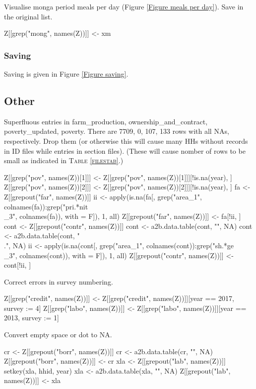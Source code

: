 Visualise monga period meals per day (\textsf{\small Figure \ref{Figure meals per day}}).
Save in the original list.
\begin{Schunk}
\begin{Sinput}
Z[[grep("mong", names(Z))]] <- xm
\end{Sinput}
\end{Schunk}


\subsubsection{Saving}


Saving is given in \textsf{\small Figure \ref{Figure saving}}.


\subsection{Other}


Superfluous entries in \textsf{farm\_production, ownership\_and\_contract, poverty\_updated, poverty}. There are 7709, 0, 107, 133 rows with all NAs, respectively.  Drop them (or otherwise this will cause many HHs without records in ID files while entries in section files). (These will cause nomber of rows to be small as indicated in \textsc{\small Table \ref{filestab}}.)
\begin{Schunk}
\begin{Sinput}
Z[[grep("pov", names(Z))[1]]] <- Z[[grep("pov", names(Z))[1]]][!is.na(year), ]
Z[[grep("pov", names(Z))[2]]] <- Z[[grep("pov", names(Z))[2]]][!is.na(year), ]
fa <- Z[[grepout("far", names(Z))]]
ii <- apply(is.na(fa[, 
	grep("area_1", colnames(fa)):grep("pri.*nit\\_3", colnames(fa)), with = F]), 1, all)
Z[[grepout("far", names(Z))]] <- fa[!ii, ]
cont <- Z[[grepout("contr", names(Z))]]
cont <- a2b.data.table(cont, "", NA)
cont <- a2b.data.table(cont, "\\.", NA)
ii <- apply(is.na(cont[, 
	grep("area_1", colnames(cont)):grep("sh.*ge\\_3", colnames(cont)), with = F]), 1, all)
Z[[grepout("contr", names(Z))]] <- cont[!ii, ]
\end{Sinput}
\end{Schunk}
Correct errors in survey numbering.
\begin{Schunk}
\begin{Sinput}
Z[[grep("credit", names(Z))]] <- Z[[grep("credit", names(Z))]][year == 2017, survey := 4]
Z[[grep("labo", names(Z))]] <- Z[[grep("labo", names(Z))]][year == 2013, survey := 1]
\end{Sinput}
\end{Schunk}
Convert empty space or dot to NA.
\begin{Schunk}
\begin{Sinput}
cr <- Z[[grepout("borr", names(Z))]]
cr <- a2b.data.table(cr, "", NA)
Z[[grepout("borr", names(Z))]] <- cr
xla <- Z[[grepout("lab", names(Z))]]
setkey(xla, hhid, year)
xla <- a2b.data.table(xla, "", NA)
Z[[grepout("lab", names(Z))]] <- xla
\end{Sinput}
\end{Schunk}


